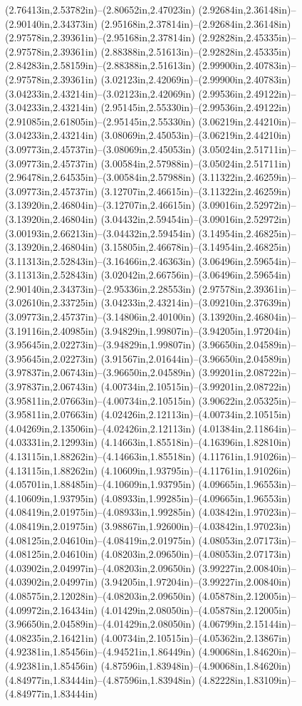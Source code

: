 (2.76413in,2.53782in)--(2.80652in,2.47023in) (2.92684in,2.36148in)--(2.90140in,2.34373in) (2.95168in,2.37814in)--(2.92684in,2.36148in) (2.97578in,2.39361in)--(2.95168in,2.37814in) (2.92828in,2.45335in)--(2.97578in,2.39361in) (2.88388in,2.51613in)--(2.92828in,2.45335in) (2.84283in,2.58159in)--(2.88388in,2.51613in) (2.99900in,2.40783in)--(2.97578in,2.39361in) (3.02123in,2.42069in)--(2.99900in,2.40783in) (3.04233in,2.43214in)--(3.02123in,2.42069in) (2.99536in,2.49122in)--(3.04233in,2.43214in) (2.95145in,2.55330in)--(2.99536in,2.49122in) (2.91085in,2.61805in)--(2.95145in,2.55330in) (3.06219in,2.44210in)--(3.04233in,2.43214in) (3.08069in,2.45053in)--(3.06219in,2.44210in) (3.09773in,2.45737in)--(3.08069in,2.45053in) (3.05024in,2.51711in)--(3.09773in,2.45737in) (3.00584in,2.57988in)--(3.05024in,2.51711in) (2.96478in,2.64535in)--(3.00584in,2.57988in) (3.11322in,2.46259in)--(3.09773in,2.45737in) (3.12707in,2.46615in)--(3.11322in,2.46259in) (3.13920in,2.46804in)--(3.12707in,2.46615in) (3.09016in,2.52972in)--(3.13920in,2.46804in) (3.04432in,2.59454in)--(3.09016in,2.52972in) (3.00193in,2.66213in)--(3.04432in,2.59454in) (3.14954in,2.46825in)--(3.13920in,2.46804in) (3.15805in,2.46678in)--(3.14954in,2.46825in) (3.11313in,2.52843in)--(3.16466in,2.46363in) (3.06496in,2.59654in)--(3.11313in,2.52843in) (3.02042in,2.66756in)--(3.06496in,2.59654in) (2.90140in,2.34373in)--(2.95336in,2.28553in) (2.97578in,2.39361in)--(3.02610in,2.33725in) (3.04233in,2.43214in)--(3.09210in,2.37639in) (3.09773in,2.45737in)--(3.14806in,2.40100in) (3.13920in,2.46804in)--(3.19116in,2.40985in) (3.94829in,1.99807in)--(3.94205in,1.97204in) (3.95645in,2.02273in)--(3.94829in,1.99807in) (3.96650in,2.04589in)--(3.95645in,2.02273in) (3.91567in,2.01644in)--(3.96650in,2.04589in) (3.97837in,2.06743in)--(3.96650in,2.04589in) (3.99201in,2.08722in)--(3.97837in,2.06743in) (4.00734in,2.10515in)--(3.99201in,2.08722in) (3.95811in,2.07663in)--(4.00734in,2.10515in) (3.90622in,2.05325in)--(3.95811in,2.07663in) (4.02426in,2.12113in)--(4.00734in,2.10515in) (4.04269in,2.13506in)--(4.02426in,2.12113in) (4.01384in,2.11864in)--(4.03331in,2.12993in) (4.14663in,1.85518in)--(4.16396in,1.82810in) (4.13115in,1.88262in)--(4.14663in,1.85518in) (4.11761in,1.91026in)--(4.13115in,1.88262in) (4.10609in,1.93795in)--(4.11761in,1.91026in) (4.05701in,1.88485in)--(4.10609in,1.93795in) (4.09665in,1.96553in)--(4.10609in,1.93795in) (4.08933in,1.99285in)--(4.09665in,1.96553in) (4.08419in,2.01975in)--(4.08933in,1.99285in) (4.03842in,1.97023in)--(4.08419in,2.01975in) (3.98867in,1.92600in)--(4.03842in,1.97023in) (4.08125in,2.04610in)--(4.08419in,2.01975in) (4.08053in,2.07173in)--(4.08125in,2.04610in) (4.08203in,2.09650in)--(4.08053in,2.07173in) (4.03902in,2.04997in)--(4.08203in,2.09650in) (3.99227in,2.00840in)--(4.03902in,2.04997in) (3.94205in,1.97204in)--(3.99227in,2.00840in) (4.08575in,2.12028in)--(4.08203in,2.09650in) (4.05878in,2.12005in)--(4.09972in,2.16434in) (4.01429in,2.08050in)--(4.05878in,2.12005in) (3.96650in,2.04589in)--(4.01429in,2.08050in) (4.06799in,2.15144in)--(4.08235in,2.16421in) (4.00734in,2.10515in)--(4.05362in,2.13867in) (4.92381in,1.85456in)--(4.94521in,1.86449in) (4.90068in,1.84620in)--(4.92381in,1.85456in) (4.87596in,1.83948in)--(4.90068in,1.84620in) (4.84977in,1.83444in)--(4.87596in,1.83948in) (4.82228in,1.83109in)--(4.84977in,1.83444in) 